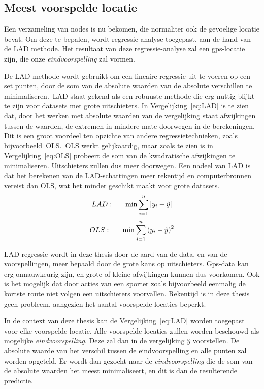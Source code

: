 \subsection{Meest voorspelde locatie}
Een verzameling van nodes is nu bekomen, die normaliter ook de gevoelige
locatie bevat. Om deze te bepalen, wordt regressie-analyse toegepast, aan de
hand van de \ac{LAD} methode. Het resultaat van deze regressie-analyse zal een
\ac{gps}-locatie zijn, die onze \textit{eindvoorspelling} zal vormen.

De \ac{LAD} methode wordt gebruikt om een lineaire regressie uit te voeren op
een set punten, door de som van de absolute waarden van de absolute verschillen
te minimaliseren.\ \ac{LAD} staat gekend als een robuuste methode die erg
nuttig blijkt te zijn voor datasets met grote uitschieters. In
Vergelijking~\ref{eq:LAD} is te zien dat, door het werken met absolute waarden
van de vergelijking staat afwijkingen tussen de waarden, de extremen in mindere
mate doorwegen in de berekeningen. Dit is een groot voordeel ten opzichte van
andere regressietechnieken, zoals
bijvoorbeeld~\ac{OLS}\cite{iqbal2021application}.~\ac{OLS} werkt gelijkaardig,
maar zoals te zien is in Vergelijking~\ref{eq:OLS} probeert de som van de
kwadratische afwijkingen te minimaliseren. Uitschieters zullen dus meer
doorwegen. Een nadeel van \ac{LAD} is dat het berekenen van de LAD-schattingen
meer rekentijd en computerbronnen vereist dan \ac{OLS}, wat het minder geschikt
maakt voor grote datasets.
\begin{equation} \label{eq:LAD}
    LAD:\indent  \min\sum\limits_{i=1}^n|y_i - \hat{y}|
\end{equation}
\begin{equation} \label{eq:OLS}
    OLS:\indent  \min\sum\limits_{i=1}^n{(y_i - \hat{y})}^2
\end{equation}

LAD regressie wordt in deze thesis door de aard van de data, en van de
voorspellingen, meer bepaald door de grote kans op uitschieters. Gps-data kan
erg onnauwkeurig zijn, en grote of kleine afwijkingen kunnen dus voorkomen. Ook
is het mogelijk dat door acties van een sporter zoals bijvoorbeeld eenmalig de
kortste route niet volgen een uitschieters voorvallen. Rekentijd is in deze
thesis geen probleem, aangezien het aantal voorspelde locaties beperkt.

In de context van deze thesis kan de Vergelijking~\ref{eq:LAD} worden toegepast
voor elke voorspelde locatie. Alle voorspelde locaties zullen worden beschouwd
als mogelijke \textit{eindvoorspelling}. Deze zal dan in de vergelijking
$\hat{y}$ voorstellen. De absolute waarde van het verschil tussen de
eindvoorspelling en alle punten zal worden opgeteld. Er wordt dan gezocht naar
de \textit{eindvoorspelling} die de som van de absolute waarden het meest
minimaliseert, en dit is dan de resulterende predictie.

